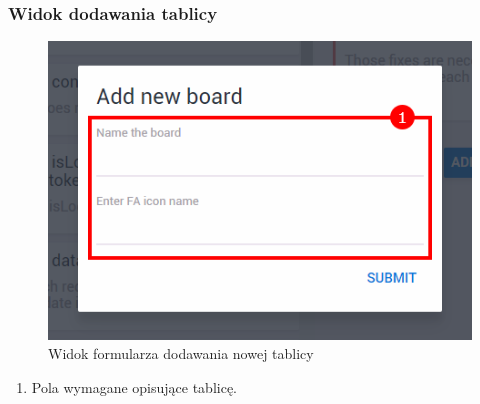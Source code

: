 \documentclass[eng,printmode]{mgr}
\begin{document}
\subsubsection{Widok dodawania tablicy}
\begin{figure}[H]
  \begin{center}
  \includegraphics[scale=0.8]{add_board}
  \end{center}
  \caption{Widok formularza dodawania nowej tablicy}
\end{figure}
\begin{enumerate}
  \item Pola wymagane opisujące tablicę.
\end{enumerate}
\newpage
\end{document}

